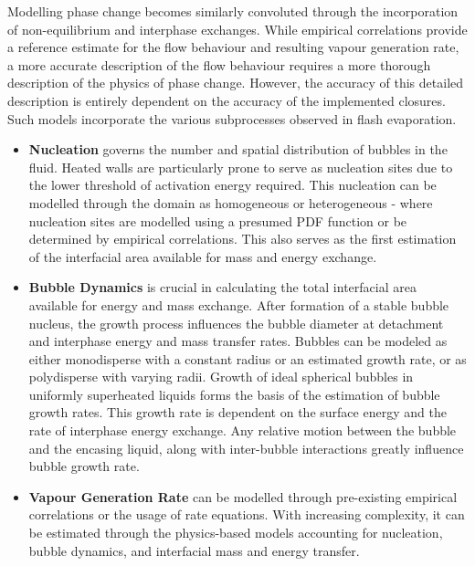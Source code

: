 Modelling phase change becomes similarly convoluted through the incorporation of non-equilibrium and interphase exchanges. While empirical correlations
 provide a reference estimate for the flow behaviour and resulting vapour generation rate, a more accurate description of the 
 flow behaviour requires a more thorough description of the physics of phase change.
However, the accuracy of this detailed description is entirely dependent on the accuracy of the 
implemented closures. Such models incorporate the various subprocesses observed in 
flash evaporation.~\cite{liaoComputationalModellingFlash2017, wallisCriticalTwophaseFlow1980, dangleComputationalFluidDynamics2018, liaoNumericalAnalysisFlashing2019} 
\begin{itemize}
  \item \textbf{Nucleation} governs the number and spatial distribution of bubbles in the fluid. Heated walls are particularly prone 
  to serve as nucleation sites due to the lower threshold of activation energy required.
   This nucleation can be modelled through the domain as homogeneous or heterogeneous - where nucleation sites are modelled using a 
presumed PDF function or be determined by empirical correlations. This also serves as the first estimation of the interfacial 
area available for mass and energy exchange.
  \item \textbf{Bubble Dynamics} is crucial in calculating the total interfacial area available for energy and mass exchange. 
  After formation of a stable bubble nucleus, the growth process influences the bubble diameter at detachment and interphase energy and mass transfer rates.
  Bubbles can be modeled as either monodisperse with a constant radius or an estimated growth rate, or as polydisperse with varying radii. 
  Growth of ideal spherical bubbles in uniformly superheated liquids forms the basis of the estimation of bubble growth rates. This growth rate 
  is dependent on the surface energy and the rate of interphase energy exchange. Any relative motion
  between the bubble and the encasing liquid, along with inter-bubble interactions greatly influence bubble growth rate.
  \item \textbf{Vapour Generation Rate} can be modelled through pre-existing empirical correlations or the usage of rate equations. With increasing 
  complexity, it can be estimated through the physics-based models accounting for nucleation, bubble dynamics, and interfacial mass and
  energy transfer.
\end{itemize}

